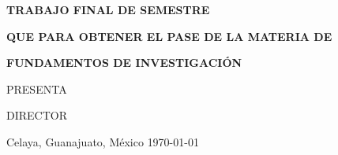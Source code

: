 {\begin{titlepage}
{{        \p@
        \begin{flushleft}
        \centerline{ \huge \bfseries \@title } \par
        \end{flushleft}

	\p@
        \begin{flushleft}
         \centerline{ \large \bfseries TRABAJO FINAL DE SEMESTRE} \par
        \end{flushleft}

	\p@
        \begin{flushleft}
          \centerline{\large \bfseries QUE PARA OBTENER EL PASE DE LA MATERIA DE} \par
        \end{flushleft}

	\p@
        \begin{flushleft}
          \centerline{ \large \bfseries FUNDAMENTOS DE INVESTIGACIÓN} \par
        \end{flushleft}

	\p@
        \begin{flushleft}
          \centerline{ \large PRESENTA} \par
        \end{flushleft}

        \begin{flushleft}
          \centerline{\Large \@author} \par
        \end{flushleft}

	\p@
        \begin{flushleft}
          \centerline{\large DIRECTOR} \par
        \end{flushleft}

        \begin{flushleft}
          \centerline{\large \instructor} \par
        \end{flushleft}

	\p@
        \begin{flushleft}
         \centerline{ \large Celaya, Guanajuato, México {\today}} \par
        \end{flushleft}

        \vfil
        }}
    \null
  \end{titlepage}%
  \setcounter{footnote}{0}%
}

\makeatother